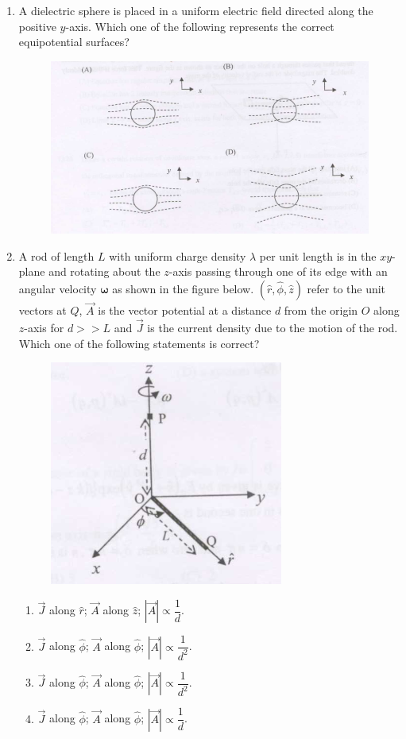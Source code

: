 \documentclass[journal,12pt,onecolumn]{IEEEtran}
\theoremstyle{remark}
\begin{document}
\begin{enumerate}
\item A dielectric sphere is placed in a uniform electric field directed along the positive $y$-axis. Which one of the following represents the correct equipotential surfaces?
\begin{figure}[H]
    \centering
    \includegraphics[width = 0.6\columnwidth]{fig/Q.33.png}
    \caption*{}
    \label{fig:Q.33}
\end{figure}
\hfill{}
\item A rod of length $L$ with uniform charge density $\lambda$ per unit length is in the $xy$-plane and rotating about the $z$-axis passing through one of its edge with an angular velocity $\boldsymbol{\omega}$ as shown in the figure below. $(\hat{r},\hat{\phi},\hat{z})$ refer to the unit vectors at $Q$, $\vec{A}$ is the vector potential at a distance $d$ from the origin $O$ along $z$-axis for $d >> L$ and $\vec{J}$ is the current density due to the motion of the rod. Which one of the following statements is correct?
\begin{figure}[H]
    \centering
    \includegraphics[width = 0.2\columnwidth]{fig/Q.34.png}
    \caption*{}
    \label{fig:Q.34}
\end{figure}
\hfill{}
\begin{multicols}{2}
\begin{enumerate}
    \item  $\vec{J}$ along $\hat{r}$; $\vec{A}$ along $\hat{z}$; $|\vec{A}|\propto \dfrac{1}{d}$.
    \item  $\vec{J}$ along $\hat{\phi}$; $\vec{A}$ along $\hat{\phi}$; $|\vec{A}|\propto \dfrac{1}{d^2}$.
    \item  $\vec{J}$ along $\hat{\phi}$; $\vec{A}$ along $\hat{\phi}$; $|\vec{A}|\propto \dfrac{1}{d^2}$.
    \item  $\vec{J}$ along $\hat{\phi}$; $\vec{A}$ along $\hat{\phi}$; $|\vec{A}|\propto \dfrac{1}{d}$.

\end{enumerate}
\end{multicols}
\end{enumerate}
\end{document}
